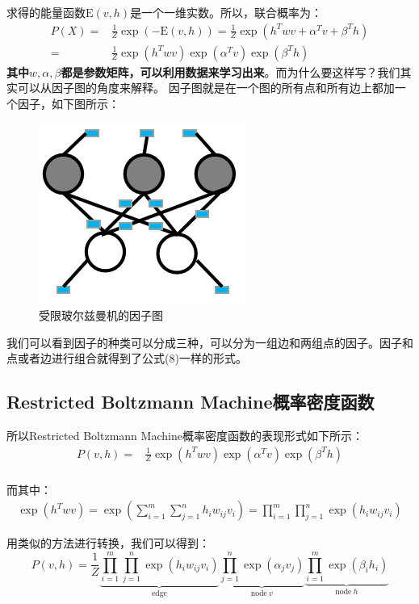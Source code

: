 \documentclass[a4paper]{article}
\begin{document}
求得的能量函数$\mathrm{E}(v,h)$是一个一维实数。所以，联合概率为：
\begin{equation}
\begin{split}
    P(X) = & \frac{1}{Z} \exp (-\mathrm{E}(v,h)) =  \frac{1}{Z} \exp (h^T w v + \alpha^T v + \beta^T h) \\
    = & \frac{1}{Z} \exp(h^T w v)\exp(\alpha^T v)\exp(\beta^T h) 
\end{split}
\end{equation}
\textbf{其中$ w,\alpha,\beta$都是参数矩阵，可以利用数据来学习出来}。而为什么要这样写？我们其实可以从因子图的角度来解释。
因子图就是在一个图的所有点和所有边上都加一个因子，如下图所示：
\begin{figure}[H]
    \centering
    \includegraphics[width=.3\textwidth]{微信图片_20200229004607.png}
    \caption{受限玻尔兹曼机的因子图}
\end{figure}

我们可以看到因子的种类可以分成三种，可以分为一组边和两组点的因子。因子和点或者边进行组合就得到了公式(8)一样的形式。

\subsection{Restricted Boltzmann Machine概率密度函数}
所以Restricted Boltzmann Machine概率密度函数的表现形式如下所示：
\begin{equation}
    \begin{split}
    P(v,h) 
    = & \frac{1}{Z} \exp(h^T w v)\exp(\alpha^T v)\exp(\beta^T h) \\
    \end{split}
\end{equation}

而其中：
\begin{equation}
    \begin{split}
        \exp(h^T w v) =  \exp(\sum_{i=1}^m \sum_{j=1}^n h_iw_{ij}v_i) = \prod_{i=1}^m \prod_{j=1}^n \exp( h_iw_{ij}v_i) 
    \end{split}
\end{equation}

用类似的方法进行转换，我们可以得到：
\begin{equation}
    P(v,h) 
    = \frac{1}{Z} \underbrace{\prod_{i=1}^m \prod_{j=1}^n \exp( h_iw_{ij}v_i)}_{\mathrm{edge}} \underbrace{\prod_{j=1}^n \exp( \alpha_jv_j)}_{\mathrm{node}\ v} \underbrace{\prod_{i=1}^m \exp( \beta_ih_i)}_{\mathrm{node}\ h} 
\end{equation}
\end{document}

